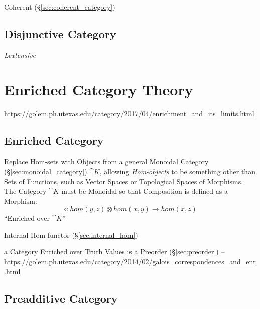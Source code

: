 Coherent (\S\ref{sec:coherent_category})



\subsection{Disjunctive Category}\label{sec:disjunctive_category}

\emph{Lextensive}



\section{Enriched Category Theory}\label{sec:enriched_category_theory}

\url{https://golem.ph.utexas.edu/category/2017/04/enrichment_and_its_limits.html}



\subsection{Enriched Category}\label{sec:enriched_category}

Replace Hom-sets with Objects from a general Monoidal Category
(\S\ref{sec:monoidal_category}) $\cat{K}$, allowing \emph{Hom-objects}
to be something other than Sets of Functions, such as Vector Spaces or
Topological Spaces of Morphisms. The Category $\cat{K}$ must be
Monoidal so that Composition is defined as a Morphism:
\[
  \circ : hom(y,z) \otimes hom(x,y) \rightarrow hom(x,z)
\]
``Enriched over $\cat{K}$''

Internal Hom-functor (\S\ref{sec:internal_hom})

a Category Enriched over Truth Values is a Preorder
(\S\ref{sec:preorder}) --
\url{https://golem.ph.utexas.edu/category/2014/02/galois_correspondences_and_enr.html}



\subsection{Preadditive Category}\label{sec:preadditive_category}

